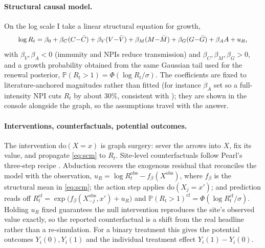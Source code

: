 \documentclass[10pt,twocolumn]{article}
\theoremstyle{definition}
\newcommand{\Rt}{R_t}
\newcommand{\Prob}{\mathbb{P}}
\begin{document}
\paragraph{Structural causal model.} On the log scale I take a linear structural
equation for growth,
\begin{equation}
\resizebox{0.92\columnwidth}{!}{$\displaystyle
\log\Rt = \beta_0 + \beta_{C}(C{-}\bar C) + \beta_{V}(V{-}\bar V)
+ \beta_{M}(M{-}\bar M) + \beta_{G}(G{-}\bar G) + \beta_{A} A + u_R$},
\label{eq:scm}
\end{equation}
with $\beta_{V},\beta_{A}<0$ (immunity and NPIs reduce transmission) and
$\beta_{C},\beta_{M},\beta_{G}>0$, and a growth probability obtained from the
same Gaussian tail used for the renewal posterior,
$\Prob(\Rt>1)=\Phi(\log\Rt/\sigma)$. The coefficients are fixed to
literature-anchored magnitudes rather than fitted (for instance $\beta_A$ set so
a full-intensity NPI cuts $\Rt$ by about $30\%$, consistent with
\citealp{flaxman2020}); they are shown in the console alongside the graph, so the
assumptions travel with the answer.

\paragraph{Interventions, counterfactuals, potential outcomes.} The intervention
$\mathrm{do}(X{=}x)$ is graph surgery: sever the arrows into $X$, fix its value,
and propagate \eqref{eq:scm} to $\Rt$. Site-level counterfactuals follow Pearl's
three-step recipe \citep{pearl2009}. Abduction recovers the exogenous
residual that reconciles the model with the observation,
$u_R=\log\Rt^{\mathrm{obs}}-f_\beta(X^{\mathrm{obs}})$, where $f_\beta$ is the
structural mean in \eqref{eq:scm}; the action step applies $\mathrm{do}(X_j{=}x')$;
and prediction reads off
$\Rt^{\mathrm{cf}}=\exp\!\big(f_\beta(X_{-j}^{\mathrm{obs}},x')+u_R\big)$ and
$\Prob(\Rt>1)^{\mathrm{cf}}=\Phi(\log\Rt^{\mathrm{cf}}/\sigma)$. Holding $u_R$
fixed guarantees the null intervention reproduces the site's observed value
exactly, so the reported counterfactual is a shift from the real headline rather
than a re-simulation. For a binary treatment this gives the potential outcomes
$Y_i(0),Y_i(1)$ and the individual treatment effect $Y_i(1)-Y_i(0)$.
\end{document}
